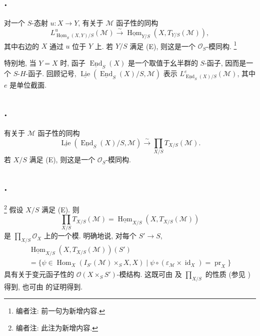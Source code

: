 \subsection*{.}
对一个 \(S\)-态射 \(u:X\to Y\), 有关于 \(\mathcal M\) 函子性的同构
\[
  L^u_{\underline{\operatorname{Hom}}_S(X,Y)/S}(\mathcal M)
  \xrightarrow{\sim}
  \underline{\operatorname{Hom}}_{Y/S}(X,T_{Y/S}(\mathcal M)),
\]
其中右边的 \(X\) 通过 \(u\) 位于 \(Y\) 上.
若 \(Y/S\) 满足 (E), 则这是一个 \(\mathcal O_S\)-模同构.
\footnote{编者注: 前一句为新增内容.}

特别地, 当 \(Y=X\) 时, 函子
\(\underline{\operatorname{End}}_S(X)\) 是一个取值于幺半群的
\(S\)-函子, 因而是一个 \(S\)-\(H\)-函子.
回顾记号, \(\underline{\operatorname{Lie}}(\underline{\operatorname{End}}_S(X)/S,
\mathcal M)\) 表示
\(L^e_{\underline{\operatorname{End}}_S(X)/S}(\mathcal M)\),
其中 \(e\) 是单位截面.

\subsection*{.}
有关于 \(\mathcal M\) 函子性的同构
\[
  \underline{\operatorname{Lie}}
    (\underline{\operatorname{End}}_S(X)/S,\mathcal M)
  \xrightarrow{\sim}
  \prod_{X/S}T_{X/S}(\mathcal M).
\]
若 \(X/S\) 满足 (E), 则这是一个 \(\mathcal O_S\)-模同构.
\footnotemark[38]

\subsection*{.}
\footnote{编者注: 此注为新增内容.}
假设 \(X/S\) 满足 (E). 则
\[
  \prod_{X/S}T_{X/S}(\mathcal M)
  =\underline{\operatorname{Hom}}_{X/S}(X,T_{X/S}(\mathcal M))
\]
是 \(\prod_{X/S}\mathcal O_X\) 上的一个模.
明确地说, 对每个 \(S'\to S\),
\begin{multline*}
  \underline{\operatorname{Hom}}_{X/S}
    (X,T_{X/S}(\mathcal M))(S')\\
  =\{\psi\in\operatorname{Hom}_X(I_{S'}(\mathcal M)\times_SX,X)
    \mid\psi\circ(\varepsilon_{\mathcal M}\times\operatorname{id}_X)
      =\operatorname{pr}_X\}
\end{multline*}
具有关于变元函子性的 \(\mathcal O(X\times_SS')\)-模结构.
这既可由  及
\(\prod_{X/S}\) 的性质 (参见 ) 得到,
也可由  的证明得到.

